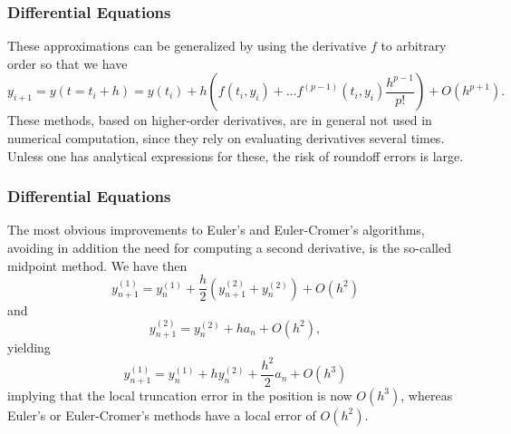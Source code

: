 \documentclass{beamer}
\begin{document}
\begin{frame}
\frametitle{Differential Equations}

\begin{block}{}
These approximations can be generalized by using the derivative $f$ to
arbitrary order so that we have
\begin{equation}
     y_{i+1}=y(t=t_i+h)=y(t_i) + h(f(t_i,y_i)+\dots f^{(p-1)}(t_i,y_i)
     \frac{h^{p-1}}{p!}) + O(h^{p+1}).
\end{equation}
These methods, based on higher-order derivatives, are in general not used
in numerical computation, since they rely on evaluating 
derivatives several times. Unless one has analytical expressions
for these, the risk of roundoff errors is large.
\end{block}
\end{frame}

\begin{frame}
\frametitle{Differential Equations}

\begin{block}{}
The most obvious improvements to Euler's and Euler-Cromer's algorithms, 
avoiding in addition the need for computing a
second derivative, is the so-called midpoint method. We have then
\begin{equation} 
   y^{(1)}_{n+1}=y^{(1)}_{n}+\frac{h}{2}\left(y^{(2)}_{n+1}+y^{(2)}_{n}\right)+O(h^2)
\end{equation}
and 
\begin{equation}
   y^{(2)}_{n+1}=y^{(2)}_{n}+h a_{n}+O(h^2),
\end{equation}
yielding
\begin{equation} 
   y^{(1)}_{n+1}=y^{(1)}_{n}+hy^{(2)}_{n}+\frac{h^2}{2}a_n+O(h^3)
\end{equation}
implying that the local truncation error in the position is now $O(h^3)$, whereas Euler's or Euler-Cromer's
methods have a local error of  $O(h^2)$.
\end{block}
\end{frame}
\end{document}
